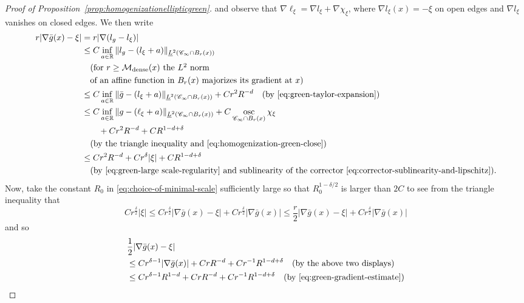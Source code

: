 \documentclass[12pt]{amsart}
\numberwithin{equation}{section}
\begin{document}
\begin{proof}[Proof of Proposition~\ref{prop:homogenizationellipticgreen}]
		and observe that $\nabla \ell_\xi = \nabla l_\xi + \nabla \chi_\xi$, where $\nabla l_\xi(x) = -\xi$ on open edges and $\nabla l_\xi$ vanishes on closed edges.
		We then write
		\begin{align*}
			r | \nabla \bar{g}(x) - \xi | &= r | \nabla (l_g  - l_\xi) |  \\
			&\leq C \inf_{a \in \operatorname{\mathbb{R}}} \| l_g - (l_\xi   +  a   ) \|_{\underline{L}^2(\mathscr{C}_{\infty} \cap B_r(x))}\\
			& \quad \mbox{({for $r \geq \mathcal{M}_{\mathrm{dense}}(x)$ the $L^2$ norm }} \\
			&\quad \mbox{of an affine function in $B_{r}(x)$ majorizes its gradient at $x$}) \\ 
			&\leq C \inf_{a \in \operatorname{\mathbb{R}}} \| \bar{g} - (l_\xi +  a ) \|_{\underline{L}^2(\mathscr{C}_{\infty} \cap B_r(x))} + C r^2 R^{-d} \quad \mbox{(by \eqref{eq:green-taylor-expansion})} \\
			&\leq C \inf_{a \in \operatorname{\mathbb{R}}}\| g - (\ell_\xi +  a ) \|_{\underline{L}^2(\mathscr{C}_{\infty} \cap B_r(x))} + C \operatorname*{osc}_{\mathscr{C}_{\infty} \cap B_r(x)} \chi_{\xi} 
			\\& \qquad + Cr^2 R^{-d} + CR^{1 - d + \delta} \\
			&\quad \mbox{(by the triangle inequality and \eqref{eq:homogenization-green-close})} \\ 
			&\leq C r^2 R^{-d} + C r^{\delta} |\xi| + C R^{1 - d + \delta} \\
			&\quad \mbox{(by \eqref{eq:green-large scale-regularity} and sublinearity of the corrector \eqref{eq:corrector-sublinearity-and-lipschitz})}.
		\end{align*}
		Now, take the constant $R_0$ in \eqref{eq:choice-of-minimal-scale} sufficiently large so that $R_0^{1-\delta/2}$ is larger than $2C$ to see from the triangle inequality that 
		\begin{equation*}
			C r^{\frac{\delta}{2}} |\xi| \leq C r^{\frac{\delta}{2}} |\nabla \bar g(x) - \xi| + C r^{\frac{\delta}{2}} |\nabla \bar g(x)| \leq \frac{r}{2} |\nabla \bar g(x) - \xi| + C r^{\frac{\delta}{2}} |\nabla \bar g(x)|
		\end{equation*}
		and so 
		\begin{align*}
			&\frac{1}{2} | \nabla \bar{g}(x) - \xi |  \\
			&\leq C r^{\delta-1} |\nabla \bar g(x)| + C r R^{-d}  + C r^{-1} R^{1 - d + \delta}   \quad \mbox{(by the above two displays)} \\
			&\leq C  r^{\delta-1} R^{1-d} + C r R^{-d} + C r^{-1} R^{1 - d + \delta}\quad \mbox{(by \eqref{eq:green-gradient-estimate})} \\

\end{align*}
\end{proof}
\end{document}
